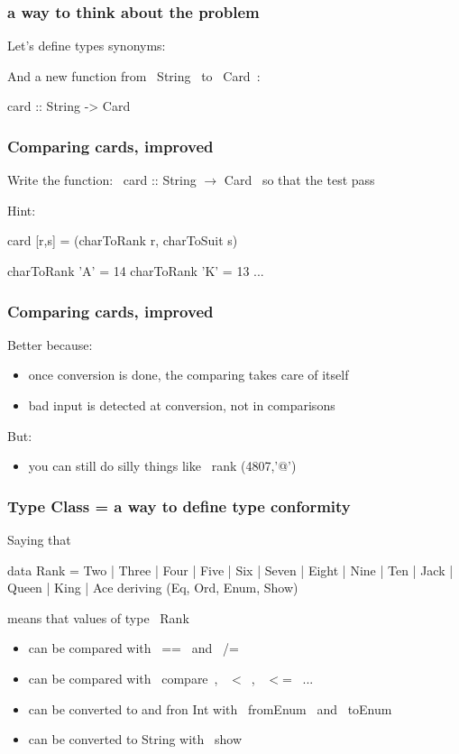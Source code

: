 \documentclass[11pt,xcolor={dvipsnames}]{beamer}
\newcommand{\lstH}[1]{}
\newcommand{\lstT}[1]{}
\begin{document}
\begin{frame}[fragile]
\frametitle{a way to think about the problem}
Let's define types synonyms:
\lstH{012}
And a new function from ~String~ to ~Card~:
\begin{haskell}
card :: String -> Card
\end{haskell}
\end{frame}
\begin{frame}[fragile]
\frametitle{Comparing cards, improved}
Write the function: ~card :: String $\rightarrow$ Card~ 
so that the test pass
\lstT{023}
Hint:
\begin{haskell}
card [r,s] = (charToRank r, charToSuit s)

charToRank 'A' = 14
charToRank 'K' = 13
...
\end{haskell}
\end{frame}
\begin{frame}[fragile]
\frametitle{Comparing cards, improved}
\lstH{024}
Better because:
\begin{itemize}
\item  once conversion is done, the comparing takes care of itself
\item  bad input is detected at conversion, not in comparisons
\end{itemize}
But:
\begin{itemize}
\item  you can still do silly things like ~rank (4807,'@')~ 
\end{itemize}
\end{frame}
\begin{frame}[fragile]
\frametitle{Type Class = a way to define type conformity}
Saying that
\begin{haskell}
data Rank = Two | Three | Four | Five | Six | Seven | Eight 
          | Nine | Ten | Jack | Queen | King | Ace
    deriving (Eq, Ord, Enum, Show)
\end{haskell}
means that values of type ~Rank~ 
\begin{itemize}
\item  can be compared with ~==~ and ~/=~ 
\item  can be compared with ~compare~, ~$<$~, ~$<$=~ ...
\item  can be converted to and fron Int with ~fromEnum~ and ~toEnum~
\item  can be converted to String with ~show~
\end{itemize}
\end{frame}
\end{document}

